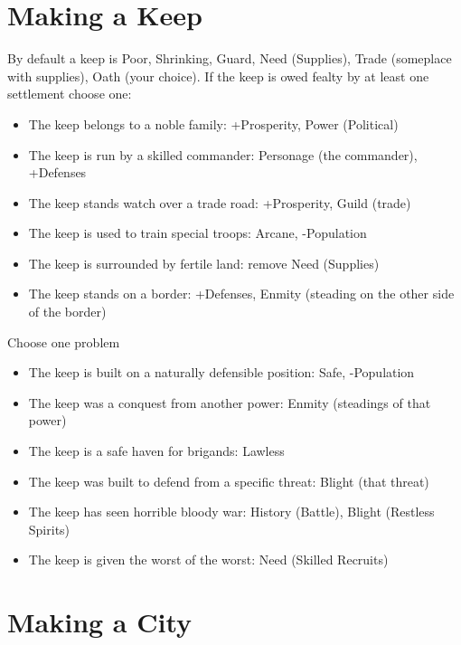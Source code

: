 \section*{Making a Keep}


 By default a keep is Poor, Shrinking, Guard, Need (Supplies), Trade (someplace with supplies), Oath (your choice). If the keep is owed fealty by at least one settlement choose one:
\begin{itemize}
\item The keep belongs to a noble family: +Prosperity, Power (Political)
\item The keep is run by a skilled commander: Personage (the commander), +Defenses
\item The keep stands watch over a trade road: +Prosperity, Guild (trade)
\item The keep is used to train special troops: Arcane, -Population
\item The keep is surrounded by fertile land: remove Need (Supplies)
\item The keep stands on a border: +Defenses, Enmity (steading on the other side of the border)

\end{itemize}


 Choose one problem
\begin{itemize}
\item The keep is built on a naturally defensible position: Safe, -Population
\item The keep was a conquest from another power: Enmity (steadings of that power)
\item The keep is a safe haven for brigands: Lawless
\item The keep was built to defend from a specific threat: Blight (that threat)
\item The keep has seen horrible bloody war: History (Battle), Blight (Restless Spirits)
\item The keep is given the worst of the worst: Need (Skilled Recruits)

\end{itemize}
\section*{Making a City}


